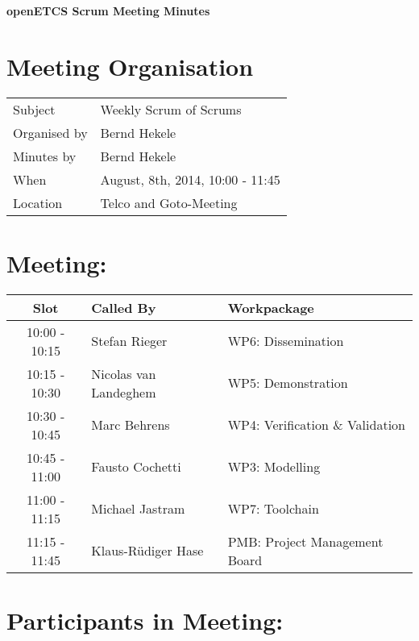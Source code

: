 \documentclass[a4paper, 11pt]{article}
\begin{document}
{\begin{center}\huge\bf openETCS Scrum Meeting Minutes\end{center}}
\section{Meeting Organisation}

\renewcommand{\arraystretch}{1.5}
\begin{supertabular}{m{.2\textwidth}m{.8\textwidth}}
Subject & Weekly Scrum of Scrums\\
Organised by & Bernd Hekele\\
Minutes by & Bernd Hekele\\
When & August, 8th, 2014, 10:00 - 11:45\\
Location & Telco and Goto-Meeting\\
\end{supertabular}

\renewcommand{\arraystretch}{1.0}
\section{Meeting:}

\begin{tabular}{|c|l|l|}
\hline
\textbf{Slot} &  \textbf{Called By} & \textbf{Workpackage} \\
\hline  
10:00 - 10:15 & Stefan Rieger & WP6: Dissemination \\\hline  
10:15 - 10:30 & Nicolas van Landeghem & WP5: Demonstration \\\hline  
10:30 - 10:45 & Marc Behrens & WP4: Verification \& Validation \\\hline  
10:45 - 11:00 & Fausto Cochetti & WP3: Modelling \\\hline  
11:00 - 11:15 & Michael Jastram & WP7: Toolchain \\\hline
11:15 - 11:45 & Klaus-R\"udiger Hase & PMB: Project Management Board \\\hline  
\end{tabular}

\section{Participants in Meeting:}
\end{document}
